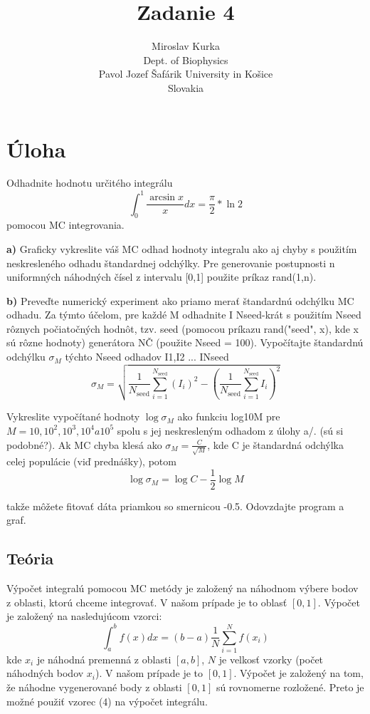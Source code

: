 \documentclass{article}
\title{Zadanie 4}
\author{Miroslav Kurka\\
  \small Dept. of Biophysics\\
  \small Pavol Jozef Šafárik University in Košice\\
  \small Slovakia 
}
\theoremstyle{definition}
\theoremstyle{remark}
\begin{document}
\maketitle


\section{Úloha}

Odhadnite hodnotu určitého integrálu
\begin{equation}
    \int_{0}^{1} \frac{\arcsin{x}}{x} dx = \frac{\pi}{2} * \ln{2} 
\end{equation}
pomocou MC integrovania. 



\textbf{a)} Graficky vykreslite váš MC odhad hodnoty integralu ako aj chyby s použitím
neskresleného odhadu štandardnej odchýlky. Pre generovanie postupnosti n uniformných náhodných čísel z intervalu [0,1]
použite príkaz rand(1,n).


\textbf{b)} Preveďte numerický experiment ako priamo merať štandardnú odchýlku MC odhadu. Za
týmto účelom, pre každé M odhadnite I Nseed-krát s použitím Nseed rôznych počiatočných
hodnôt, tzv. seed (pomocou príkazu rand("seed", x), kde x sú rôzne hodnoty)
generátora NČ (použite Nseed = 100). Vypočítajte štandardnú odchýlku $\sigma_M$ týchto Nseed
odhadov I1,I2 ... INseed
\begin{equation}
    \sigma_M = \sqrt{\frac{1}{N_{\text{seed}}} \sum_{i=1}^{N_{\text{seed}}} (I_i)^2 - \left(\frac{1}{N_{\text{seed}}} \sum_{i=1}^{N_{\text{seed}}} I_i\right)^2}
\end{equation}
    
Vykreslite vypočítané hodnoty $\log{\sigma_M}$ ako funkciu log10M pre $M = 10, 10^2, 10^3, 10^4 a 10^5$
spolu s jej neskresleným odhadom z úlohy a/. (sú si podobné?). Ak MC chyba klesá ako
$\sigma_M=\frac{C}{\sqrt{M}}$, kde C je štandardná odchýlka celej populácie (viď prednášky), potom
\begin{equation}
    \log{\sigma_M} = \log{C} - \frac{1}{2} \log{M}
\end{equation}

takže môžete fitovať dáta priamkou so smernicou -0.5. Odovzdajte program a graf.


\subsection{Teória}\label{sec:nothing}

Výpočet integralú pomocou MC metódy je založený na náhodnom výbere bodov z oblasti, ktorú chceme integrovať. V našom prípade je to oblasť $[0,1]$. Výpočet je založený na nasledujúcom vzorci:
\begin{equation}
    \int_{a}^{b} f(x) dx = (b-a) \frac{1}{N} \sum_{i=1}^{N} f(x_i)
\end{equation}
kde $x_i$ je náhodná premenná z oblasti $[a,b]$, $N$ je velkosť vzorky (počet náhodných bodov $x_i$). V našom prípade je to $[0,1]$. Výpočet je založený na tom, že náhodne vygenerované body z oblasti $[0,1]$ sú rovnomerne rozložené. Preto je možné použiť vzorec (4) na výpočet integrálu. 
\end{document}

